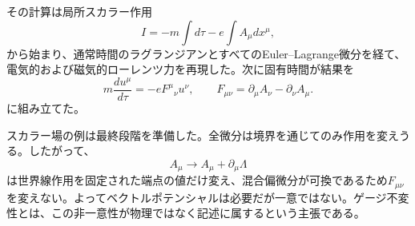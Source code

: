 その計算は局所スカラー作用
\begin{equation}
I
=
-m\int d\tau
-e\int A_\mu dx^\mu,
\end{equation}
から始まり、通常時間のラグランジアンとすべてのEuler--Lagrange微分を経て、電気的および磁気的ローレンツ力を再現した。次に固有時間が結果を
\begin{equation}
m\frac{du^\mu}{d\tau}
=
-eF^\mu{}_\nu u^\nu,
\qquad
F_{\mu\nu}
=
\partial_\mu A_\nu-\partial_\nu A_\mu.
\end{equation}
に組み立てた。

スカラー場の例は最終段階を準備した。全微分は境界を通じてのみ作用を変えうる。したがって、
\begin{equation}
A_\mu\longrightarrow A_\mu+\partial_\mu\Lambda
\end{equation}
は世界線作用を固定された端点の値だけ変え、混合偏微分が可換であるため\(F_{\mu\nu}\)を変えない。よってベクトルポテンシャルは必要だが一意ではない。ゲージ不変性とは、この非一意性が物理ではなく記述に属するという主張である。